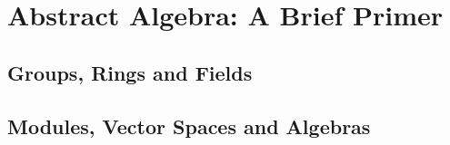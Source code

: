 \section{Abstract Algebra: A Brief Primer}

\subsection{Groups, Rings and Fields}






\subsection{Modules, Vector Spaces and Algebras}




















